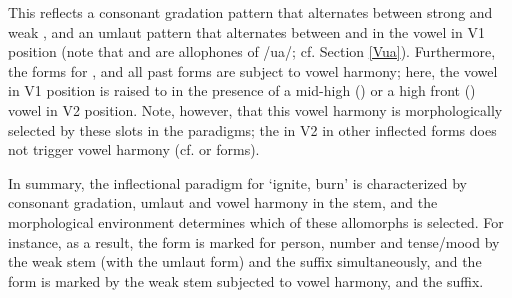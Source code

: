 This reflects a consonant gradation pattern that alternates between strong  and weak , and an umlaut pattern that alternates between  and  in the vowel in V1 position (note that  and  are allophones of /ua/; cf. Section \ref{Vua}). 
Furthermore, the forms for ,  and all past forms are subject to vowel harmony; here, the vowel in V1 position is raised to  in the presence of a mid-high () or a high front () vowel in V2 position. Note, however, that this vowel harmony is morphologically selected by these slots in the paradigms; the  in V2 in other inflected forms does not trigger vowel harmony (cf.  or  forms). 

In summary, the inflectional paradigm for  ‘ignite, burn’ is characterized by consonant gradation, umlaut and vowel harmony in the stem, and the morphological environment determines which of these allomorphs is selected. %
For instance, as a result, the  form  is marked for person, number and tense/mood by the weak  stem (with the  umlaut form) and the  suffix simultaneously, and the  form  is marked by the weak  stem subjected to vowel harmony, and the  suffix. 

